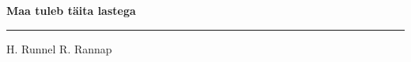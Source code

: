 \documentclass[10pt]{book}
\begin{document}
{
  \samepage
  \raggedbottom
  \raggedright
  \sloppy


  \vspace{0.2in}

  \noindent\begin{minipage}{.1\textwidth}
    \hfill\vspace{0.1in}
  \end{minipage}%
  \noindent\begin{minipage}{.8\textwidth}
    \centering
    \bfseries
    \large Maa tuleb t\"aita lastega
  \end{minipage}%
  \noindent\begin{minipage}{.1\textwidth}
      \hfill\vspace{0.1in}
  \end{minipage}

  \nopagebreak[4]
  \vspace{0.1in}
  \nopagebreak[4]
  \hrule height 0.05ex
  \nopagebreak[4]
  \vspace{-0.05in}

  {\footnotesize H. Runnel \hfill R. Rannap }\\
  \vspace{0.01in}



}
\end{document}
